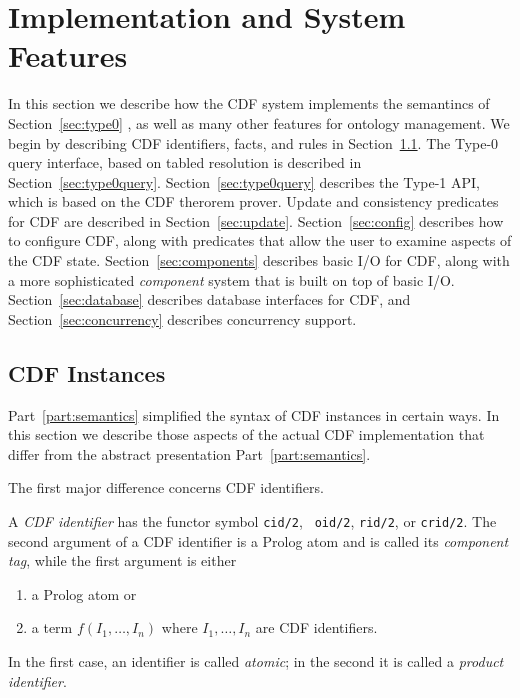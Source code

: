 %

\section{Implementation and System Features} \label{sec:impl}
%
In this section we describe how the CDF system implements the
semantincs of Section~\ref{sec:type0} , as well as many other features
for ontology management.  We begin by describing CDF identifiers,
facts, and rules in Section~\ref{sec:instance}.  The Type-0 query
interface, based on tabled resolution is described in
Section~\ref{sec:type0query}.  Section~\ref{sec:type0query} describes
the Type-1 API, which is based on the CDF therorem prover.  Update and
consistency predicates for CDF are described in
Section~\ref{sec:update}.  Section~\ref{sec:config} describes how to
configure CDF, along with predicates that allow the user to examine
aspects of the CDF state.  Section~\ref{sec:components} describes
basic I/O for CDF, along with a more sophisticated {\em component}
system that is built on top of basic I/O.  Section~\ref{sec:database}
describes database interfaces for CDF, and
Section~\ref{sec:concurrency} describes concurrency support.



\subsection{CDF Instances} \label{sec:instance}

Part~\ref{part:semantics} simplified the syntax of CDF instances in
certain ways.  In this section we describe those aspects of the actual
CDF implementation that differ from the abstract presentation
Part~\ref{part:semantics}.

The first major difference concerns CDF identifiers.

\begin{definition} \label{def:cdfids}
A {\em CDF identifier} has the functor symbol {\tt cid/2}, {\tt
oid/2}, {\tt rid/2}, or {\tt crid/2}.  The second argument of a CDF
identifier is a Prolog atom and is called its {\em component tag},
while the first argument is either
\begin{enumerate}
\item a Prolog atom or 
\item a term $f(I_1,\ldots,I_n)$ where $I_1,\ldots,I_n$ are CDF identifiers.
\end{enumerate}
In the first case, an identifier is called {\em atomic}; in the second
it is called a {\em product identifier}.
\end{definition}

